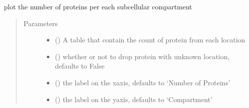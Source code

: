 \documentclass[letterpaper,10pt,english]{sphinxmanual}
\begin{document}
\begin{fulllineitems}
\label{\detokenize{IPTK.Visualization:IPTK.Visualization.vizTools.plotly_num_protein_per_location}}
plot the number of proteins per each sub\sphinxhyphen{}cellular compartment
\begin{quote}\begin{description}
\item[{Parameters}] \leavevmode\begin{itemize}
\item {} 
 () \textendash{} A table that contain the count of protein from each location

\item {} 
 (\sphinxstyleliteralemphasis{\sphinxupquote{, }}) \textendash{} whether or not to drop protein with unknown location, defaults to False

\item {} 
 (\sphinxstyleliteralemphasis{\sphinxupquote{, }}) \textendash{} the label on the x\sphinxhyphen{}axis, defaults to ‘Number of Proteins’

\item {} 
 (\sphinxstyleliteralemphasis{\sphinxupquote{, }}) \textendash{} the label on the y\sphinxhyphen{}axis, defaults to ‘Compartment’


\end{itemize}
\end{description}
\end{quote}
\end{fulllineitems}
\end{document}
